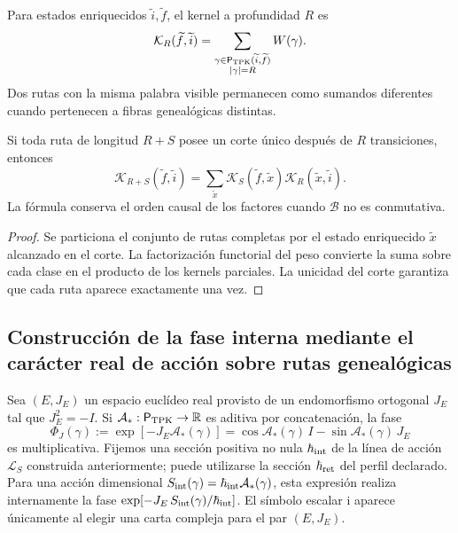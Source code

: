 Para estados enriquecidos \(\widetilde i,\widetilde f\), el kernel a
profundidad \(R\) es
\begin{equation}
 \mathcal K_R(\widetilde f,\widetilde i)
 =\sum_{\substack{
   \gamma\in\mathsf P_{\rm TPK}(\widetilde i,\widetilde f)\\
   |\gamma|=R}}
 W(\gamma).
 \label{x_reciprocidad:eq:kernel-genealogico-finito-rev2}
\end{equation}
Dos rutas con la misma palabra visible permanecen como sumandos diferentes
cuando pertenecen a fibras genealógicas distintas.

\begin{proposition}
\label{x_reciprocidad:prop:composicion-kernel-enriquecido-rev2}
Si toda ruta de longitud \(R+S\) posee un corte único después de \(R\)
transiciones, entonces
\[
 \mathcal K_{R+S}(\widetilde f,\widetilde i)
 =\sum_{\widetilde x}
 \mathcal K_S(\widetilde f,\widetilde x)
 \mathcal K_R(\widetilde x,\widetilde i).
\]
La fórmula conserva el orden causal de los factores cuando \(\mathcal B\) no
es conmutativa.
\end{proposition}

\begin{proof}
Se particiona el conjunto de rutas completas por el estado enriquecido
\(\widetilde x\) alcanzado en el corte. La factorización functorial del peso
convierte la suma sobre cada clase en el producto de los kernels parciales.
La unicidad del corte garantiza que cada ruta aparece exactamente una vez.
\end{proof}

\subsection{Construcción de la fase interna mediante el carácter real de acción sobre rutas genealógicas}

Sea \((E,J_E)\) un espacio euclídeo real provisto de un endomorfismo
ortogonal \(J_E\) tal que \(J_E^2=-I\). Si
\(\mathcal A_*:\mathsf P_{\rm TPK}\to\mathbb R\) es aditiva por
concatenación, la fase
\begin{equation}
 \Phi_J(\gamma)
 :=\exp[-J_E\mathcal A_*(\gamma)]
 =\cos\mathcal A_*(\gamma)\,I
  -\sin\mathcal A_*(\gamma)\,J_E
 \label{x_reciprocidad:eq:fase-interna-caminos-rev2}
\end{equation}
es multiplicativa. Fijemos una sección positiva no nula
\(\hbar_{\rm int}\) de la línea de acción \(\mathcal L_S\)
construida anteriormente; puede utilizarse la sección
\(\hbar_{\rm ret}\) del perfil declarado.
Para una acción dimensional
\(S_{\rm int}(\gamma)=\hbar_{\rm int}\mathcal A_*(\gamma)\), esta
expresión realiza internamente la fase
\(\exp[-J_E\,S_{\rm int}(\gamma)/\hbar_{\rm int}]\). El símbolo escalar
\(\mathrm i\) aparece únicamente al elegir una carta compleja para el par
\((E,J_E)\).

